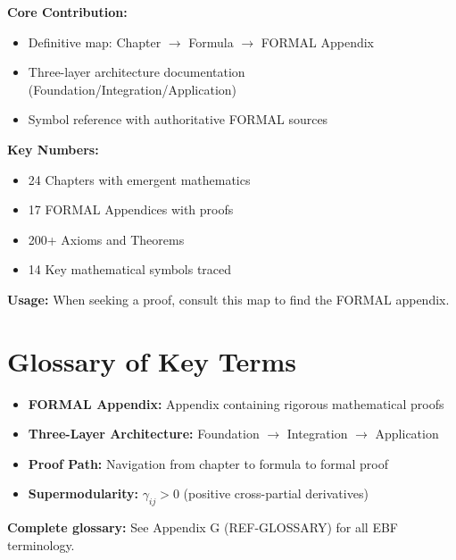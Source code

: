 \begin{tcolorbox}[colback=blue!5!white, colframe=blue!75!black,
    title=\textbf{Appendix UNMAPPED_FM Summary}]

\textbf{Core Contribution:}
\begin{itemize}[nosep]
    \item Definitive map: Chapter $\rightarrow$ Formula $\rightarrow$ FORMAL Appendix
    \item Three-layer architecture documentation (Foundation/Integration/Application)
    \item Symbol reference with authoritative FORMAL sources
\end{itemize}

\textbf{Key Numbers:}
\begin{itemize}[nosep]
    \item 24 Chapters with emergent mathematics
    \item 17 FORMAL Appendices with proofs
    \item 200+ Axioms and Theorems
    \item 14 Key mathematical symbols traced
\end{itemize}

\textbf{Usage:} When seeking a proof, consult this map to find the FORMAL appendix.

\end{tcolorbox}

\section{Glossary of Key Terms}
\label{sec:fm-glossary}

\begin{itemize}[nosep]
    \item \textbf{FORMAL Appendix:} Appendix containing rigorous mathematical proofs
    \item \textbf{Three-Layer Architecture:} Foundation $\rightarrow$ Integration $\rightarrow$ Application
    \item \textbf{Proof Path:} Navigation from chapter to formula to formal proof
    \item \textbf{Supermodularity:} $\gamma_{ij} > 0$ (positive cross-partial derivatives)
\end{itemize}

\medskip
\textbf{Complete glossary:} See Appendix G (REF-GLOSSARY) for all EBF terminology.

